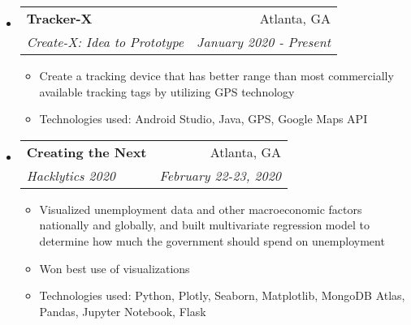 \documentclass[letterpaper,10pt]{article}
\makeatletter
\newcommand{\resitem}[1]{\item #1 \vspace{-3.5pt}}
\newcommand{\ressubheading}[4]{
\begin{tabular*}{7.0in}{l@{\extracolsep{\fill}}r}
		\textbf{#1} & #2 \\
		\textit{#3} & \textit{#4} \\
\end{tabular*}\vspace{-6pt}}
\makeatother
\begin{document}
\begin{itemize}
\item
    \ressubheading{Tracker-X}{Atlanta, GA}{Create-X: Idea to Prototype}{January 2020 - Present}
    \begin{itemize}
        \resitem{Create a tracking device that has better range than most commercially available tracking tags by utilizing GPS technology}
        \resitem{Technologies used: Android Studio, Java, GPS, Google Maps API}
    \end{itemize}
\item
    \ressubheading{Creating the Next}{Atlanta, GA}{Hacklytics 2020}{February 22-23, 2020}
    \begin{itemize}
        \resitem{Visualized unemployment data and other macroeconomic factors nationally and globally, and built multivariate regression model to determine how much the government should spend on unemployment}
        \resitem{Won best use of visualizations}
        \resitem{Technologies used: Python, Plotly, Seaborn, Matplotlib, MongoDB Atlas, Pandas, Jupyter Notebook, Flask}
    \end{itemize}
    

\end{itemize}
\end{document}
